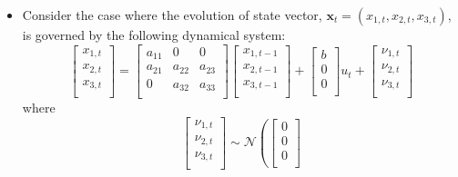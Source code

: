 \documentclass[12pt,a4paper]{article}
\begin{document}
\begin{itemize}
  \begin{itemize}
  \item Consider the case where
    the evolution of state vector, $\bm{x}_{t}=(x_{1,t},x_{2,t},x_{3,t})$,
    is governed by the following dynamical system:
    \begin{equation}\nonumber%
      \begin{bmatrix}
        x_{1,t} \\
        x_{2,t} \\
        x_{3,t} \\
      \end{bmatrix}
      =
      \begin{bmatrix}
        a_{11} & 0 & 0 \\
        a_{21} & a_{22} & a_{23} \\
        0 & a_{32} & a_{33} \\
      \end{bmatrix}
      \begin{bmatrix}
        x_{1,t-1} \\
        x_{2,t-1} \\
        x_{3,t-1} \\
      \end{bmatrix}
      +
      \begin{bmatrix}
        b \\
        0 \\
        0 \\
      \end{bmatrix}
      u_{t}
      + 
      \begin{bmatrix}
        \nu_{1,t} \\
        \nu_{2,t} \\
        \nu_{3,t} \\
      \end{bmatrix}
    \end{equation}
    where
    \begin{equation}\nonumber%
      \begin{bmatrix}
        \nu_{1,t} \\
        \nu_{2,t} \\
        \nu_{3,t} \\
      \end{bmatrix}
      \sim \mathcal{N}
      \left(
        \begin{bmatrix}
          0 \\
          0 \\
          0 \\

\end{bmatrix}
\end{equation}
\end{itemize}
\end{itemize}
\end{document}
